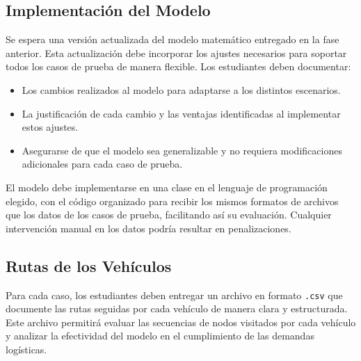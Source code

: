 \documentclass[12pt]{article}
\begin{document}
\subsection{Implementación del Modelo}
Se espera una versión actualizada del modelo matemático entregado en la fase anterior. Esta actualización debe incorporar los ajustes necesarios para soportar todos los casos de prueba de manera flexible. Los estudiantes deben documentar:
\begin{itemize}
    \item Los cambios realizados al modelo para adaptarse a los distintos escenarios.
    \item La justificación de cada cambio y las ventajas identificadas al implementar estos ajustes.
    \item Asegurarse de que el modelo sea generalizable y no requiera modificaciones adicionales para cada caso de prueba.
\end{itemize}
El modelo debe implementarse en una clase en el lenguaje de programación elegido, con el código organizado para recibir los mismos formatos de archivos que los datos de los casos de prueba, facilitando así su evaluación. Cualquier intervención manual en los datos podría resultar en penalizaciones.

\subsection{Rutas de los Vehículos}
Para cada caso, los estudiantes deben entregar un archivo en formato \texttt{.csv} que documente las rutas seguidas por cada vehículo de manera clara y estructurada. Este archivo permitirá evaluar las secuencias de nodos visitados por cada vehículo y analizar la efectividad del modelo en el cumplimiento de las demandas logísticas.
\end{document}
